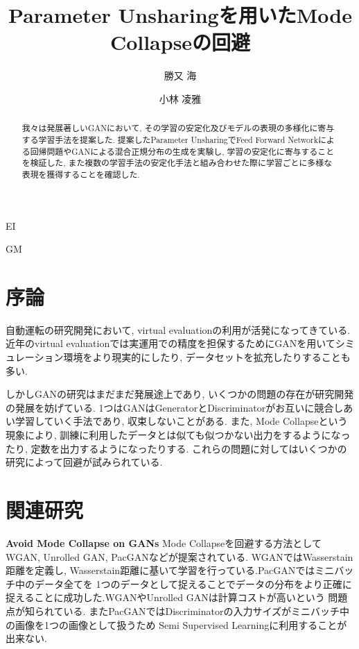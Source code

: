 \documentclass[techrep, submit, noauthor,preface]{ipsj}
\begin{document}
\title{Parameter Unsharingを用いたMode Collapseの回避}


\author{勝又 海}{}{EI}
\author{小林 凌雅}{}{GM}

\maketitle
\thispagestyle{empty} 
\begin{abstract}

  我々は発展著しいGANにおいて, その学習の安定化及びモデルの表現の多様化に寄与する学習手法を提案した.
  提案したParameter UnsharingでFeed Forward Networkによる回帰問題やGANによる混合正規分布の生成を実験し,
  学習の安定化に寄与することを検証した,
  また複数の学習手法の安定化手法と組み合わせた際に学習ごとに多様な表現を獲得することを確認した.

\end{abstract}

\section{序論}

自動運転の研究開発において, virtual evaluationの利用が活発になってきている.
近年のvirtual evaluationでは実運用での精度を担保するためにGANを用いてシミュレーション環境をより現実的にしたり, 
データセットを拡充したりすることも多い.

しかしGAN\cite{gan}の研究はまだまだ発展途上であり, いくつかの問題の存在が研究開発の発展を妨げている\cite{tutorial}.
1つはGANはGeneratorとDiscriminatorがお互いに競合しあい学習していく手法であり, 収束しないことがある.
また, Mode Collapseという現象により, 訓練に利用したデータとは似ても似つかない出力をするようになったり,
定数を出力するようになったりする.
これらの問題に対してはいくつかの研究によって回避が試みられている.

\section{関連研究}

{\bf Avoid Mode Collapse on GANs} Mode Collapseを回避する方法としてWGAN\cite{wgan}, Unrolled GAN\cite{unrolled}, PacGAN\cite{pacgan}などが提案されている.
WGANではWasserstain距離を定義し, Wasserstain距離に基いて学習を行っている.PacGANではミニバッチ中のデータ全てを
1つのデータとして捉えることでデータの分布をより正確に捉えることに成功した.WGANやUnrolled GANは計算コストが高いという
問題点が知られている. またPacGANではDiscriminatorの入力サイズがミニバッチ中の画像を1つの画像として扱うため
Semi Supervised Learningに利用することが出来ない.
\end{document}
